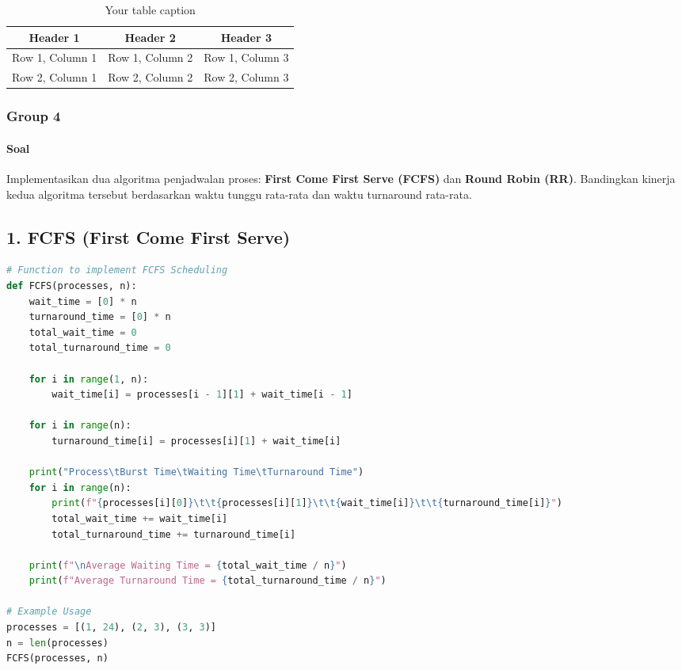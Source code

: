 \documentclass[12pt]{article}
\begin{document}
\begin{table}[htbp] %
    \centering
    \begin{tabular}{|c|c|c|} %
    \hline
    Header 1 & Header 2 & Header 3 \\ %
    \hline
    Row 1, Column 1 & Row 1, Column 2 & Row 1, Column 3 \\ %
    \hline
    Row 2, Column 1 & Row 2, Column 2 & Row 2, Column 3 \\ %
    \hline
    \end{tabular}
    \caption{Your table caption} %
    \label{tab:your_label} %
\end{table}

\subsubsection{Group 4}
\paragraph{Soal}
Implementasikan dua algoritma penjadwalan proses: \textbf{First Come First Serve (FCFS)} dan \textbf{Round Robin (RR)}. Bandingkan kinerja kedua algoritma tersebut berdasarkan waktu tunggu rata-rata dan waktu turnaround rata-rata.

\subsection*{1. FCFS (First Come First Serve)}

\begin{lstlisting}[language=Python, caption=FCFS Algorithm]
# Function to implement FCFS Scheduling
def FCFS(processes, n):
    wait_time = [0] * n
    turnaround_time = [0] * n
    total_wait_time = 0
    total_turnaround_time = 0
    
    for i in range(1, n):
        wait_time[i] = processes[i - 1][1] + wait_time[i - 1]
    
    for i in range(n):
        turnaround_time[i] = processes[i][1] + wait_time[i]
    
    print("Process\tBurst Time\tWaiting Time\tTurnaround Time")
    for i in range(n):
        print(f"{processes[i][0]}\t\t{processes[i][1]}\t\t{wait_time[i]}\t\t{turnaround_time[i]}")
        total_wait_time += wait_time[i]
        total_turnaround_time += turnaround_time[i]
    
    print(f"\nAverage Waiting Time = {total_wait_time / n}")
    print(f"Average Turnaround Time = {total_turnaround_time / n}")

# Example Usage
processes = [(1, 24), (2, 3), (3, 3)]
n = len(processes)
FCFS(processes, n)
\end{lstlisting}
\end{document}
